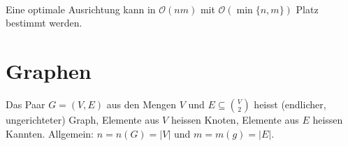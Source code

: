 \documentclass{scrartcl}
\begin{document}
 \\

Eine optimale Ausrichtung kann in $\mathcal{O}(nm)$ mit $\mathcal{O}(\min\{n,m\})$ Platz bestimmt werden.


\section{Graphen}
\begin{shaded}
Das Paar $G=(V,E)$ aus den Mengen $V$ und $E\subseteq\binom{V}{2}$ heisst (endlicher, ungerichteter) Graph, Elemente aus $V$ heissen Knoten, Elemente aus $E$ heissen Kannten. Allgemein: $n=n(G)=\vert V\vert$ und $m=m(g)=\vert E\vert$.
\end{shaded}
\end{document}
